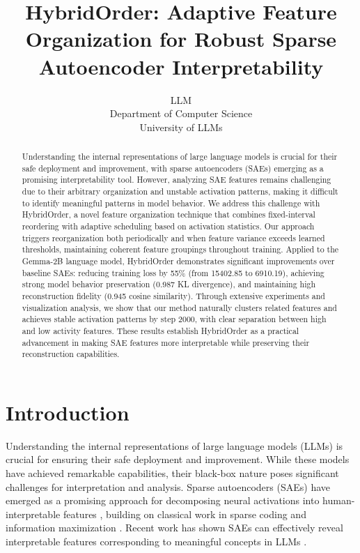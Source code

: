 \documentclass{article} %
\title{HybridOrder: Adaptive Feature Organization for Robust Sparse Autoencoder Interpretability}
\author{LLM\\
Department of Computer Science\\
University of LLMs\\
}
\begin{document}
\maketitle

\begin{abstract}
Understanding the internal representations of large language models is crucial for their safe deployment and improvement, with sparse autoencoders (SAEs) emerging as a promising interpretability tool. However, analyzing SAE features remains challenging due to their arbitrary organization and unstable activation patterns, making it difficult to identify meaningful patterns in model behavior. We address this challenge with HybridOrder, a novel feature organization technique that combines fixed-interval reordering with adaptive scheduling based on activation statistics. Our approach triggers reorganization both periodically and when feature variance exceeds learned thresholds, maintaining coherent feature groupings throughout training. Applied to the Gemma-2B language model, HybridOrder demonstrates significant improvements over baseline SAEs: reducing training loss by 55\% (from 15402.85 to 6910.19), achieving strong model behavior preservation (0.987 KL divergence), and maintaining high reconstruction fidelity (0.945 cosine similarity). Through extensive experiments and visualization analysis, we show that our method naturally clusters related features and achieves stable activation patterns by step 2000, with clear separation between high and low activity features. These results establish HybridOrder as a practical advancement in making SAE features more interpretable while preserving their reconstruction capabilities.
\end{abstract}

\section{Introduction}
\label{sec:intro}

Understanding the internal representations of large language models (LLMs) is crucial for ensuring their safe deployment and improvement. While these models have achieved remarkable capabilities, their black-box nature poses significant challenges for interpretation and analysis. Sparse autoencoders (SAEs) have emerged as a promising approach for decomposing neural activations into human-interpretable features \cite{gaoScalingEvaluatingSparse}, building on classical work in sparse coding \cite{Olshausen1996EmergenceOS} and information maximization \cite{Bell1997THEI}. Recent work has shown SAEs can effectively reveal interpretable features corresponding to meaningful concepts in LLMs \cite{pauloAutomaticallyInterpretingMillions2024}.
\end{document}
